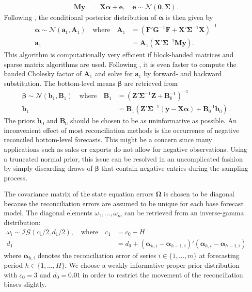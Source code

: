 \documentclass[a4paper,fleqn,11pt]{article}
\begin{document}
\begin{align}
	\label{eq:meas2}
	\textbf{M}\textbf{y} & = \textbf{X} \boldsymbol{\alpha} + \textbf{e}, \quad \textbf{e} \sim \mathcal{N}(\textbf{0}, \boldsymbol{\Sigma}).
\end{align}
Following \cite{Chan2009}, the conditional posterior distribution of $\boldsymbol{\alpha}$ is then given by
\begin{align*}
	\boldsymbol{\alpha} \sim \mathcal{N}(\textbf{a}_1, \textbf{A}_1) \quad \text{where} \quad \textbf{A}_1 &= (\textbf{F}'\textbf{G}^{-1}\textbf{F} + \textbf{X}'\boldsymbol{\Sigma}^{-1}\textbf{X})^{-1} \\
	\textbf{a}_1 &= \textbf{A}_1 (\textbf{X}'\boldsymbol{\Sigma}^{-1}\textbf{M}\textbf{y}).
\end{align*}
This algorithm is computationally very efficient if block-banded matrices and sparse matrix algorithms are used. Following \cite{Chan2009}, it is even faster to compute the banded Cholesky factor of $\textbf{A}_1$ and solve for $\textbf{a}_1$ by forward- and backward substitution. The bottom-level means $\boldsymbol{\beta}$ are retrieved from
\begin{align*}
	\boldsymbol{\beta} \sim \mathcal{N}(\textbf{b}_1,\textbf{B}_1) \quad \text{where} \quad \textbf{B}_1 &= \left(\textbf{Z}'\boldsymbol{\Sigma}^{-1}\textbf{Z} + \textbf{B}_0^{-1} \right)^{-1}\\
	 \textbf{b}_1 &= \textbf{B}_1 \left(\textbf{Z}'\boldsymbol{\Sigma}^{-1} (\textbf{y} - \textbf{X}\boldsymbol{\alpha}) + \textbf{B}_0^{-1} \textbf{b}_0 \right).
\end{align*}
The priors $\textbf{b}_0$ and $\textbf{B}_0$ should be chosen to be as uninformative as possible. An inconvenient effect of most reconciliation methods is the occurrence of negative reconciled bottom-level forecasts. This might be a concern since many applications such as sales or exports do not allow for negative observations. Using a truncated normal prior, this issue can be resolved in an uncomplicated fashion by simply discarding draws of $\boldsymbol{\beta}$ that contain negative entries during the sampling process.

The covariance matrix of the state equation errors $\boldsymbol{\Omega}$ is chosen to be diagonal because the reconciliation errors are assumed to be unique for each base forecast model. The diagonal elements $\omega_1, \hdots, \omega_m$ can be retrieved from an inverse-gamma distribution:
\begin{align*}
\omega_i \sim \mathcal{IG}(c_1/2,d_1/2), \quad \text{where} \quad c_1 &= c_0 + H\\
	d_1 &= d_0 + (\boldsymbol{\alpha}_{h,i} - \boldsymbol{\alpha}_{h-1,i})'(\boldsymbol{\alpha}_{h,i} - \boldsymbol{\alpha}_{h-1,i})
\end{align*}
where $\boldsymbol{\alpha}_{h,i}$ denotes the reconciliation error of series $i \in \{1, \hdots, m \}$ at forecasting period $h \in \{1, \hdots, H\}$. We choose a weakly informative proper prior distribution with $c_0 = 3$ and $d_0 = 0.01$ in order to restrict the movement of the reconciliation biases slightly. 
\end{document}
